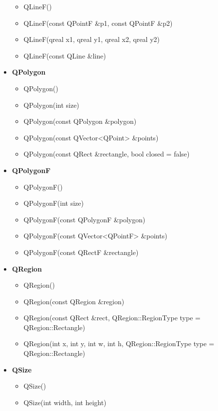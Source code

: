 \documentclass{report}
\begin{document}
\begin{itemize}
\begin{itemize}
            \item QLineF()
            \item QLineF(const QPointF \&p1, const QPointF \&p2)
            \item QLineF(qreal x1, qreal y1, qreal x2, qreal y2)
            \item QLineF(const QLine \&line)
        \end{itemize}
    \item \textbf{QPolygon}
        \begin{itemize}
            \item QPolygon()
            \item QPolygon(int size)
            \item QPolygon(const QPolygon \&polygon)
            \item QPolygon(const QVector<QPoint> \&points)
            \item QPolygon(const QRect \&rectangle, bool closed = false)
        \end{itemize}
    \item \textbf{QPolygonF}
        \begin{itemize}
            \item QPolygonF()
            \item QPolygonF(int size)
            \item QPolygonF(const QPolygonF \&polygon)
            \item QPolygonF(const QVector<QPointF> \&points)
            \item QPolygonF(const QRectF \&rectangle)
        \end{itemize}
    \item \textbf{QRegion}
        \begin{itemize}
            \item QRegion()
            \item QRegion(const QRegion \&region)
            \item QRegion(const QRect \&rect, QRegion::RegionType type = QRegion::Rectangle)
            \item QRegion(int x, int y, int w, int h, QRegion::RegionType type = QRegion::Rectangle)
        \end{itemize}
    \item \textbf{QSize}
        \begin{itemize}
            \item QSize()
            \item QSize(int width, int height)

\end{itemize}
\end{itemize}
\end{document}
